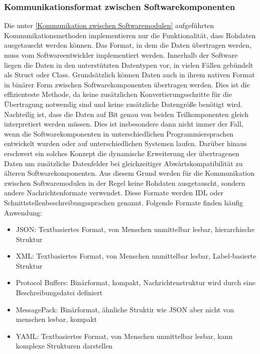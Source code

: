 \subsubsection{Kommunikationsformat zwischen Softwarekomponenten}

Die unter \autoref{Kommunikation zwischen Softwaremodulen} aufgeführten Kommunikationsmethoden implementieren nur die Funktionalität, dass Rohdaten ausgetauscht werden können. Das Format, in dem die Daten übertragen werden, muss vom Softwareentwickler implementiert werden. Innerhalb der Software liegen die Daten in den unterstützten Datentypen vor, in vielen Fällen gebündelt als Struct oder Class. Grundsätzlich können Daten auch in ihrem nativen Format in binärer Form zwischen Softwarekomponenten übertragen werden. Dies ist die effizienteste Methode, da keine zusätzlichen Konvertierungsschritte für die Übertragung notwendig sind und keine zusätzliche Datengröße benötigt wird. Nachteilig ist, dass die Daten auf Bit genau von beiden Teilkomponenten gleich interpretiert werden müssen. Dies ist insbesondere dann nicht immer der Fall, wenn die Softwarekomponenten in unterschiedlichen Programmiersprachen entwickelt wurden oder auf unterschiedlichen Systemen laufen. Darüber hinaus erschwert ein solches Konzept die dynamische Erweiterung der übertragenen Daten um zusätzliche Datenfelder bei gleichzeitiger Abwärtskompatibilität zu älteren Softwarekomponenten. Aus diesem Grund werden für die Kommunikation zwischen Softwaremodulen in der Regel keine Rohdaten ausgetauscht, sondern andere Nachrichtenformate verwendet. Diese Formate werden \gls{IDL} oder Schnittstellenbeschreibungssprachen genannt. Folgende Formate finden häufig Anwendung:

\begin{itemize}
    \item \gls{JSON}: Textbasiertes Format, von Menschen unmittelbar lesbar, hierarchische Struktur
    \item \gls{XML}: Textbasiertes Format, von Menschen unmittelbar lesbar, Label-basierte Struktur
    \item Protocol Buffers: Binärformat, kompakt, Nachrichtenstruktur wird durch eine Beschreibungsdatei definiert
    \item MessagePack: Binärformat, ähnliche Struktir wie \gls{JSON} aber nicht von menschen lesbar, kompakt
    \item \gls{YAML}: Textbasiertes Format, von Menschen unmittelbar lesbar, kann komplexe Strukturen darstellen
\end{itemize}

